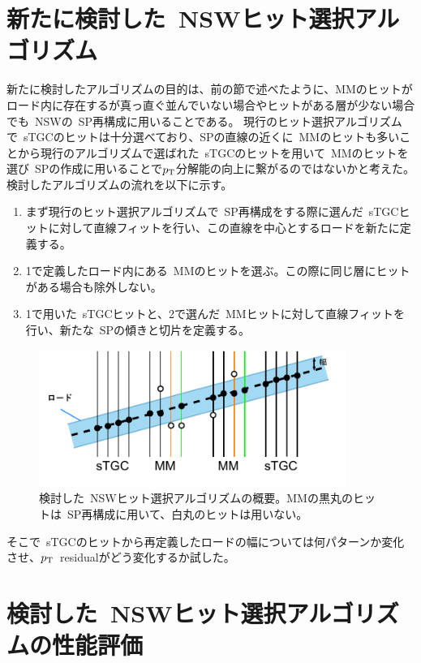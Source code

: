 \section{新たに検討した~NSWヒット選択アルゴリズム}\label{chapter5-4}
新たに検討したアルゴリズムの目的は、前の節で述べたように、MMのヒットがロード内に存在するが真っ直ぐ並んでいない場合やヒットがある層が少ない場合でも~NSWの~SP再構成に用いることである。
現行のヒット選択アルゴリズムで~sTGCのヒットは十分選べており、SPの直線の近くに~MMのヒットも多いことから現行のアルゴリズムで選ばれた~sTGCのヒットを用いて~MMのヒットを選び~SPの作成に用いることで$p_\mathrm{T}$分解能の向上に繋がるのではないかと考えた。
検討したアルゴリズムの流れを以下に示す。

\begin{enumerate}
    \item まず現行のヒット選択アルゴリズムで~SP再構成をする際に選んだ~sTGCヒットに対して直線フィットを行い、この直線を中心とするロードを新たに定義する。
    \item 1で定義したロード内にある~MMのヒットを選ぶ。この際に同じ層にヒットがある場合も除外しない。
    \item 1で用いた~sTGCヒットと、2で選んだ~MMヒットに対して直線フィットを行い、新たな~SPの傾きと切片を定義する。
\end{enumerate}


\begin{figure}[H]
    \centering
    \includegraphics[clip, width=10cm]{fig/5/newHitSelectAlg.pdf}
    \caption{検討した~NSWヒット選択アルゴリズムの概要。MMの黒丸のヒットは~SP再構成に用いて、白丸のヒットは用いない。}
    \label{fig:5-12}
\end{figure}

そこで~sTGCのヒットから再定義したロードの幅については何パターンか変化させ、$p_\mathrm{T}$~residualがどう変化するか試した。


\section{検討した~NSWヒット選択アルゴリズムの性能評価}\label{chapter5-5}